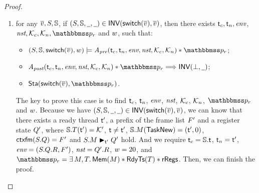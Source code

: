 \begin{proof}
\begin{enumerate}
        \item for any $\overline{v}, S, \mathbb{S}$, 
        if $(S, \mathbb{S}, \underline{\ \,}, \underline{\ \,}) \in 
            \textsf{INV}{(\mathsf{switch}(\overline{v}), \overline{v})}$, 
        then there exists $\textsf{t}_c, \textsf{t}_n, \textit{env}$, $\nst, 
        \hthrdlocalst_c, \hthrdlocalst_n, \relastP_r$ and $w$, 
        such that:
        \begin{itemize}
            \item $\asrtmodel{(\state, \hpstate, \primsw(\args{\val}), \word)}
                {\Apre(\thrdid_c, \thrdid_n, \env, \nst, \hthrdlocalst_c, 
                \hthrdlocalst_n) \sepstar \relastP_r}$; 
            \item  $\Apost(\thrdid_c, \thrdid_n, \env, \nst, \hthrdlocalst_c, 
                \hthrdlocalst_n) \sepstar \relastP_r \Longrightarrow 
                \INV{(\primdone, \notCare)}$; 
            \item $\Sta(\primsw(\args{\val}), \relastP_r)$. 
        \end{itemize}
        \vspace*{0.3em}
        The key to prove this case is to find $\textsf{t}_c$, $\textsf{t}_n$, $\textit{env}$, 
        $\textit{nst}$, $\mathcal{K}_c$, $\mathcal{K}_n$, $\relastP_r$ and $w$. 
        Because we have $(S, \mathbb{S}, \underline{\ \,}, \underline{\ \,}) \in 
            \textsf{INV}{(\mathsf{switch}(\overline{v}), \overline{v})}$, we can know that there exists 
        a ready thread $\textsf{t}'$, a prefix of the frame list $F'$ 
        and a register state $Q'$, where 
        $\mathbb{S}.T(\textsf{t}') = \mathcal{K}'$, 
        $\textsf{t} \neq \textsf{t}'$, $\mathbb{S}.M(\mathsf{TaskNew}) = (\textsf{t}', 0)$, 
        $\textsf{ctxfm}(S.Q) = F'$ 
        and ${S.M} \blacktriangleright_{\textsf{t}'} {Q'}$ hold. 
        And we require $\textsf{t}_c = \mathbb{S}.\textsf{t}$, $\textsf{t}_n = \textsf{t}'$, 
        $\textit{env} = (S.Q.R, F')$, $\textit{nst} = Q'.R$, $w = 20$, 
        and $\relastP_r = \exists \, \Mem, \thrdpool. \, \MemRAsrt{\Mem}
        \sepstar \RdyTsRAsrt{\thrdpool} \sepstar \rRegs$. Then, we can finish 
        the proof. 


\end{enumerate}
\end{proof}
